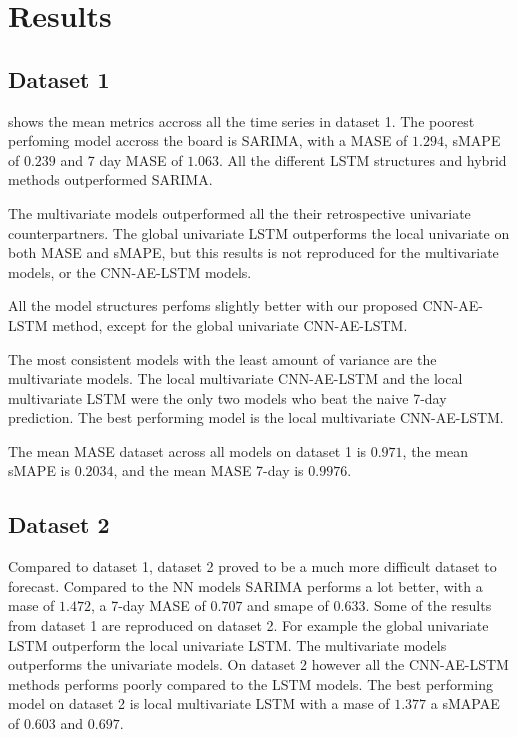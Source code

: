 \section{Results}
\label{section:discussion&results:experiment-results}
\subsection{Dataset 1}
 shows the mean metrics accross
all the time series in dataset 1. The poorest perfoming model accross the board
is SARIMA, with a MASE of $1.294$, sMAPE of $0.239$ and 7 day MASE of $1.063$.
All the different LSTM structures and hybrid methods outperformed SARIMA.

The multivariate models outperformed all the their retrospective univariate counterpartners.
The global univariate LSTM outperforms the local univariate on both MASE and sMAPE,
but this results is not reproduced for the multivariate models, or the CNN-AE-LSTM models.

All the model structures perfoms slightly better with our proposed CNN-AE-LSTM method, except for
the global univariate CNN-AE-LSTM.

The most consistent models with the least amount of variance are the multivariate models.
The local multivariate CNN-AE-LSTM and the local multivariate LSTM were the only two models
who beat the naive 7-day prediction. The best performing model is the local multivariate CNN-AE-LSTM.

The mean MASE dataset across all models on dataset 1 is $0.971$,
the mean sMAPE is $0.2034$,
and the mean MASE 7-day is $0.9976$.


\subsection{Dataset 2}
Compared to dataset 1, dataset 2 proved to be a much more difficult dataset to forecast.
Compared to the NN models SARIMA performs a lot better, with a mase of $1.472$, a 7-day MASE of $0.707$ and smape of $0.633$.
Some of the results from dataset 1 are reproduced on dataset 2. For example the global univariate LSTM outperform
the local univariate LSTM. The multivariate models outperforms the univariate models.
On dataset 2 however all the CNN-AE-LSTM methods performs poorly compared to the LSTM models.
The best performing model on dataset 2 is local multivariate LSTM with a mase of $1.377$ a sMAPAE of $0.603$
and $0.697$.

